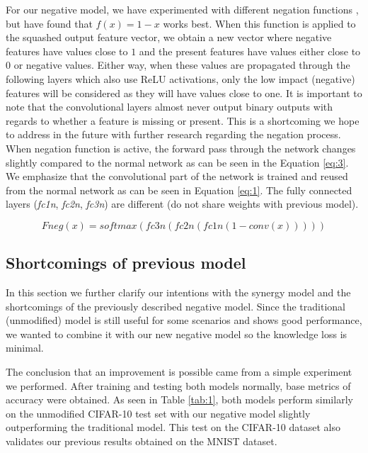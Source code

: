 \documentclass[b5paper]{book}
\let\cite\parencite
\begin{document}
For our negative model, we have experimented with different negation functions \cite{milovsevic2019classification}, but have found that \( f(x) = 1 - x \) works best. When this function is applied to the squashed output feature vector, we obtain a new vector where negative features have values close to \(1\) and the present features have values either close to \(0\) or negative values. Either way, when these values are propagated through the following layers which also use ReLU activations, only the low impact (negative) features will be considered as they will have values close to one. It is important to note that the convolutional layers almost never output binary outputs with regards to whether a feature is missing or present. This is a shortcoming we hope to address in the future with further research regarding the negation process. When negation function is active, the forward pass through the network changes slightly compared to the normal network as can be seen in the Equation \ref{eq:3}. We emphasize that the convolutional part of the network is trained and reused from the normal network as can be seen in Equation \ref{eq:1}. The fully connected layers (\emph{fc1n}, \emph{fc2n}, \emph{fc3n}) are different (do not share weights with previous model).

\begin{equation}\label{eq:3}
Fneg(x) = softmax(fc3n(fc2n(fc1n(1 - conv(x)))))
\end{equation}

\subsection{Shortcomings of previous model}
\label{shortcomings}

In this section we further clarify our intentions with the synergy model and the shortcomings of the previously described negative model. Since the traditional (unmodified) model is still useful for some scenarios and shows good performance, we wanted to combine it with our new negative model so the knowledge loss is minimal. 

The conclusion that an improvement is possible came from a simple experiment we performed. After training and testing both models normally, base metrics of accuracy were obtained. As seen in Table \ref{tab:1}, both models perform similarly on the unmodified CIFAR-10 test set with our negative model slightly outperforming the traditional model. This test on the CIFAR-10 dataset also validates our previous results obtained on the MNIST dataset. 
\end{document}
